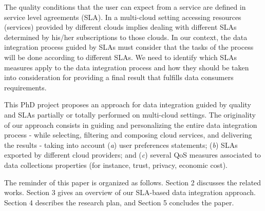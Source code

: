 The quality conditions that the user can expect from a service are defined in
 service level agreements (SLA). In a multi-cloud setting accessing resources (services) provided by different clouds implies dealing with different SLAs determined by his/her subscriptions to those clouds. In our context, the data integration process guided by SLAs must consider that the tasks of the process will be done according to different SLAs. We need to identify which SLAs measures apply to the data integration process and how they should be taken into consideration for providing a final result that fulfills data consumers requirements.
%
%
%

This PhD project proposes 
an approach for data integration guided by quality and SLAs partially or totally performed on multi-cloud settings.  The originality of our approach consists in guiding and personalizing
the entire data integration process - while selecting, filtering and composing
cloud services, and delivering the results - taking into account (\textit{a})
user preferences statements; (\textit{b}) SLAs exported by different
cloud providers; and (\textit{c}) several QoS measures associated to data
collections properties (for instance, trust, privacy, economic cost).    

The reminder of this paper is organized as follows.
Section 2 discusses the related works.
Section 3 gives an overview of our SLA-based data integration approach.
Section 4 describes the research plan, and  Section 5 concludes the paper.
